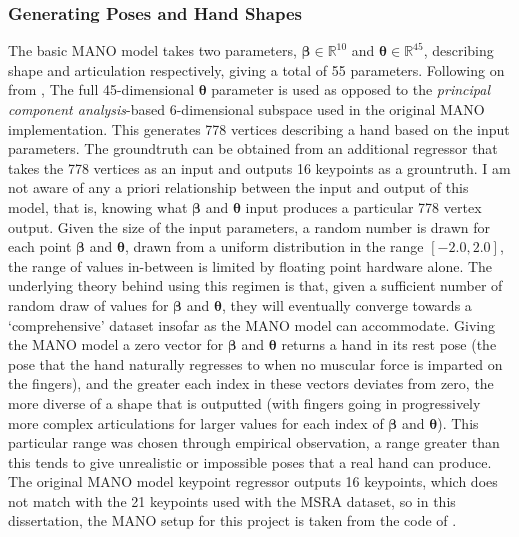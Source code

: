 \subsubsection{Generating Poses and Hand Shapes}
The basic MANO model takes two parameters, $\bm{\beta} \in \mathbb{R}^{10}$ and $\bm{\theta} \in \mathbb{R}^{45}$, describing shape and articulation respectively, giving a total of 55 parameters. Following on from \cite{baek2019pushing}, The full 45-dimensional $\bm{\theta}$ parameter is used as opposed to the {\slshape principal component analysis}-based 6-dimensional subspace used in the original MANO implementation. This generates 778 vertices describing a hand based on the input parameters. The groundtruth can be obtained from an additional regressor that takes the 778 vertices as an input and outputs 16 keypoints as a grountruth. I am not aware of any a priori relationship between the input and output of this model, that is, knowing what $\bm{\beta}$ and $\bm{\theta}$ input produces a particular 778 vertex output. Given the size of the input parameters, a random number is drawn for each point $\bm{\beta}$ and $\bm{\theta}$, drawn from a uniform distribution in the range $[-2.0, 2.0]$, the range of values in-between is limited by floating point hardware alone. The underlying theory behind using this regimen is that, given a sufficient number of random draw of values for $\bm{\beta}$ and $\bm{\theta}$, they will eventually converge towards a `comprehensive' dataset insofar as the MANO model can accommodate. Giving the MANO model a zero vector for $\bm{\beta}$ and $\bm{\theta}$ returns a hand in its rest pose (the pose that the hand naturally regresses to when no muscular force is imparted on the fingers), and the greater each index in these vectors deviates from zero, the more diverse of a shape that is outputted (with fingers going in progressively more complex articulations for larger values for each index of $\bm{\beta}$ and $\bm{\theta}$). This particular range was chosen through empirical observation, a range greater than this tends to give unrealistic or impossible poses that a real hand can produce. The original MANO model keypoint regressor outputs 16 keypoints, which does not match with the 21 keypoints used with the MSRA dataset, so in this dissertation, the MANO setup for this project is taken from the code of \cite{baek2019pushing, zhang2019end}.

